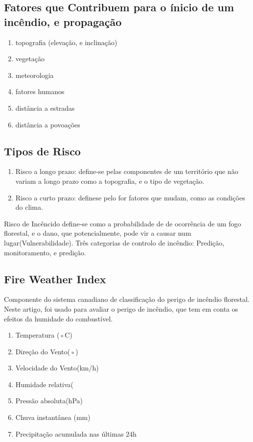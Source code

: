 \documentclass{article}
\begin{document}
\subsection{Fatores que Contribuem para o ínicio de um incêndio, e propagação}
\begin{enumerate}
\item topografia (elevação, e inclinação)
\item vegetação
\item meteorologia
\item fatores humanos
\item distância a estradas
\item distância a povoações
\end{enumerate}

\subsection{Tipos de Risco}
\begin{enumerate}
\item Risco a longo prazo: define-se pelas componentes de um território que não variam a longo prazo como a topografia, e o tipo de vegetação.
\item Risco a curto prazo: definese pelo for fatores que mudam, como as condições do clima.
\end{enumerate}
Risco de Incêncido define-se como a probabilidade de de ocorrência de um fogo florestal, e o dano, que potencialmente, pode vir a causar num lugar(Vulnerabilidade).
Três categorias de controlo de incêndio: Predição, monitoramento, e predição.

\subsection{Fire Weather Index} 
Componente do sistema canadiano de classificação do perigo de incêndio florestal. Neste artigo, foi usado para avaliar o perigo de incêndio, que tem em conta os efeitos da humidade do combustível.

\begin{enumerate}
    \item Temperatura (◦C)
    \item Direção do Vento(◦)
    \item Velocidade do Vento(km/h)
    \item Humidade relativa(%
    \item Pressão absoluta(hPa)
    \item Chuva instantânea (mm)
    \item Precipitação acumulada nas últimas 24h
\end{enumerate}
\end{document}
